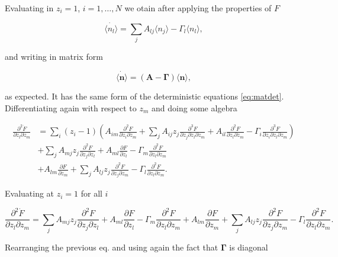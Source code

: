 Evaluating in $z_i=1$, $i=1,\dotsc,N$ we otain after applying the properties of $F$

\begin{equation*}
\dot{\langle n_l \rangle} = \sum_jA_{lj}\langle n_j\rangle-\Gamma_l\langle n_l\rangle,
\end{equation*}

and writing in matrix form

\begin{equation}
  \label{eq:mas-general_ave}
  \dot{\langle \mathbf{n}\rangle} = (\mathbf{A}-\mathbf{\Gamma})\langle \mathbf{n}\rangle,
\end{equation}

as expected. It has the same form of the deterministic equations \eqref{eq:matdet}. Differentiating again with respect to $z_m$ and doing some algebra

\begin{equation*}
  \begin{split}
    \frac{\partial^2 \dot{F}}{\partial z_l \partial z_m} &= \sum_i(z_i-1) \left(A_{im}\frac{\partial^2F}{\partial z_i \partial z_m} + \sum_jA_{ij}z_j\frac{\partial^3F}{\partial z_j \partial z_l \partial z_m}+A_{il}\frac{\partial^2F}{\partial z_l\partial z_m} - \Gamma_i\frac{\partial^3F}{\partial z_i \partial z_l \partial z_m}   \right)\\
    &+\sum_jA_{mj}z_j\frac{\partial^2F}{\partial z_j\partial z_l}+A_{ml}\frac{\partial F}{\partial z_l} - \Gamma_m\frac{\partial^2F}{\partial z_l\partial z_m}\\
    &+ A_{lm}\frac{\partial F}{\partial z_m} + \sum_jA_{lj}z_j\frac{\partial^2F}{\partial z_j\partial z_m}-\Gamma_l\frac{\partial^2F}{\partial z_l\partial z_m}.
  \end{split}
\end{equation*}

Evaluating at $z_i=1$ for all $i$

\begin{equation*}
  \frac{\partial^2\dot{F}}{\partial z_l \partial z_m} = \sum_jA_{mj}z_j\frac{\partial^2F}{\partial z_j\partial z_l}+A_{ml}\frac{\partial F}{\partial z_l} - \Gamma_m\frac{\partial^2F}{\partial z_l\partial z_m} + A_{lm}\frac{\partial F}{\partial z_m} + \sum_jA_{lj}z_j\frac{\partial^2F}{\partial z_j\partial z_m}-\Gamma_l\frac{\partial^2F}{\partial z_l\partial z_m}.
\end{equation*}

Rearranging the previous eq. and using again the fact that $\mathbf{\Gamma}$ is diagonal

